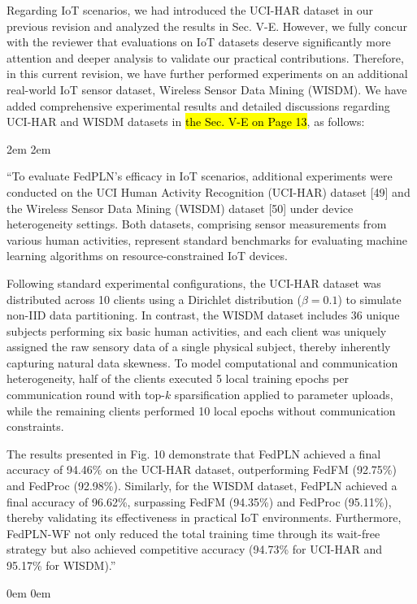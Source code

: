 \documentclass[a4paper,12pt]{article}
\newcommand{\hlb}[1]{\sethlcolor{b}\hl{#1}}
\begin{document}
Regarding IoT scenarios, we had introduced the UCI-HAR dataset in our previous revision and analyzed the results in Sec. V-E.
However, we fully concur with the reviewer that evaluations on IoT datasets deserve significantly more attention and deeper analysis to validate our practical contributions.
Therefore, in this current revision, we have further performed experiments on an additional real-world IoT sensor dataset, Wireless Sensor Data Mining (WISDM).
We have added comprehensive experimental results and detailed discussions regarding UCI-HAR and WISDM datasets in \hlb{the Sec. V-E on Page 13}, as follows:

\leftskip 2em
\rightskip 2em
\medskip

``To evaluate FedPLN's efficacy in IoT scenarios, additional experiments were conducted on the UCI Human Activity Recognition (UCI-HAR) dataset [49] and the Wireless Sensor Data Mining (WISDM) dataset [50] under device heterogeneity settings.
Both datasets, comprising sensor measurements from various human activities, represent standard benchmarks for evaluating machine learning algorithms on resource-constrained IoT devices.

Following standard experimental configurations, the UCI-HAR dataset was distributed across 10 clients using a Dirichlet distribution ($\beta=0.1$) to simulate non-IID data partitioning.
In contrast, the WISDM dataset includes 36 unique subjects performing six basic human activities, and each client was uniquely assigned the raw sensory data of a single physical subject, thereby inherently capturing natural data skewness.
To model computational and communication heterogeneity, half of the clients executed 5 local training epochs per communication round with top-$k$ sparsification applied to parameter uploads, while the remaining clients performed 10 local epochs without communication constraints.

The results presented in Fig. 10 demonstrate that FedPLN achieved a final accuracy of 94.46\% on the UCI-HAR dataset, outperforming FedFM (92.75\%) and FedProc (92.98\%).
Similarly, for the WISDM dataset, FedPLN achieved a final accuracy of 96.62\%, surpassing FedFM (94.35\%) and FedProc (95.11\%), thereby validating its effectiveness in practical IoT environments.
Furthermore, FedPLN-WF not only reduced the total training time through its wait-free strategy but also achieved competitive accuracy (94.73\% for UCI-HAR and 95.17\% for WISDM).''

\leftskip 0em
\rightskip 0em
\medskip
\end{document}
